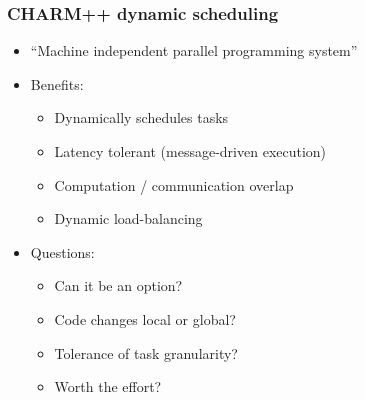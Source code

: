 \begin{frame}[fragile] \frametitle{CHARM++ dynamic scheduling}
\begin{itemize}
\item ``Machine independent parallel programming system''
\item Benefits:
\begin{itemize}
\item Dynamically schedules tasks
\item Latency tolerant (message-driven execution)
\item Computation / communication overlap
\item Dynamic load-balancing
\end{itemize} 
\item Questions:
\begin{itemize}
\item Can it be an option?
\item Code changes local or global?
\item Tolerance of task granularity?
\item Worth the effort?
\end{itemize}
\end{itemize}
\end{frame}
